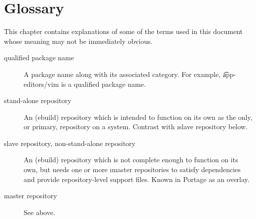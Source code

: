 \chapter{Glossary}
\label{ch:glossary}

This chapter contains explanations of some of the terms used in this document whose meaning may not
be immediately obvious.

\begin{description}
\item[qualified package name] A package name along with its associated category. For example,
    \t{app-editors/vim} is a qualified package name.
\item[stand-alone repository] An (ebuild) repository which is intended to function on its own as the
    only, or primary, repository on a system. Contrast with \i{slave repository} below.
\item[slave repository, non-stand-alone repository] An (ebuild) repository which is not complete
    enough to function on its own, but needs one or more \i{master repositories} to
    satisfy dependencies and provide repository-level support files. Known in Portage as an overlay.
\item[master repository] See above.

\end{description}


